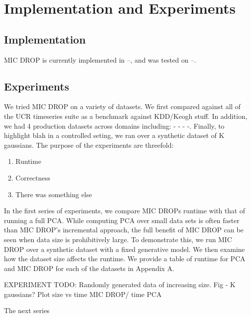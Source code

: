 \section{Implementation and Experiments}
\label{sec:experiments}

\subsection{Implementation}
MIC DROP is currently implemented in --, and was tested on --. 

\subsection{Experiments}
We tried MIC DROP on a variety of datasets. We first compared against all of the UCR timeseries suite as a benchmark against KDD/Keogh stuff. In addition, we had 4 production datasets across domains including: - - - -. Finally, to highlight blah in a controlled seting, we ran over a synthetic dataset of K gaussians. The purpose of the experiments are threefold: 

\begin{enumerate}
\item{Runtime}
\item{Correctness}
\item{There was something else}
\end{enumerate}

In the first series of experiments, we compare MIC DROPs runtime with that of running a full PCA. While computing PCA over small data sets is often faster than MIC DROP's incremental approach, the full benefit of MIC DROP can be seen when data size is prohibitively large. To demonstrate this, we run MIC DROP over a synthetic dataset with a fixed generative model. We then examine how the dataset size affects the runtime. We provide a table of runtime for PCA and MIC DROP for each of the datasets in Appendix A. 

EXPERIMENT TODO: Randomly generated data of increasing size. Fig - K gaussians? Plot size vs time MIC DROP/ time PCA

The next series 

